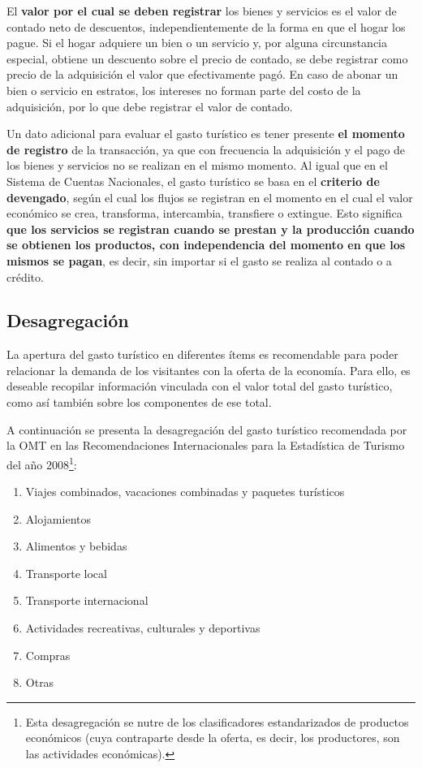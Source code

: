 \documentclass[
]{book}
\begin{document}
El \textbf{valor por el cual se deben registrar} los bienes y servicios es el valor de contado neto de descuentos, independientemente de la forma en que el hogar los pague. Si el hogar adquiere un bien o un servicio y, por alguna circunstancia especial, obtiene un descuento sobre el precio de contado, se debe registrar como precio de la adquisición el valor que efectivamente pagó. En caso de abonar un bien o servicio en estratos, los intereses no forman parte del costo de la adquisición, por lo que debe registrar el valor de contado.

Un dato adicional para evaluar el gasto turístico es tener presente \textbf{el momento de registro} de la transacción, ya que con frecuencia la adquisición y el pago de los bienes y servicios no se realizan en el mismo momento. Al igual que en el Sistema de Cuentas Nacionales, el gasto turístico se basa en el \textbf{criterio de devengado}, según el cual los flujos se registran en el momento en el cual el valor económico se crea, transforma, intercambia, transfiere o extingue. Esto significa \textbf{que los servicios se registran cuando se prestan y la producción cuando se obtienen los productos, con independencia del momento en que los mismos se pagan}, es decir, sin importar si el gasto se realiza al contado o a crédito.

\hypertarget{desagregaciuxf3n}{%
\subsection{Desagregación}\label{desagregaciuxf3n}}

La apertura del gasto turístico en diferentes ítems es recomendable para poder relacionar la demanda de los visitantes con la oferta de la economía. Para ello, es deseable recopilar información vinculada con el valor total del gasto turístico, como así también sobre los componentes de ese total.

A continuación se presenta la desagregación del gasto turístico recomendada por la OMT en las Recomendaciones Internacionales para la Estadística de Turismo del año 2008\footnote{Esta desagregación se nutre de los clasificadores estandarizados de productos económicos (cuya contraparte desde la oferta, es decir, los productores, son las actividades económicas).}:

\begin{enumerate}
\def\labelenumi{\arabic{enumi}.}
\item
  Viajes combinados, vacaciones combinadas y paquetes turísticos
\item
  Alojamientos
\item
  Alimentos y bebidas
\item
  Transporte local
\item
  Transporte internacional
\item
  Actividades recreativas, culturales y deportivas
\item
  Compras
\item
  Otras
\end{enumerate}
\end{document}
